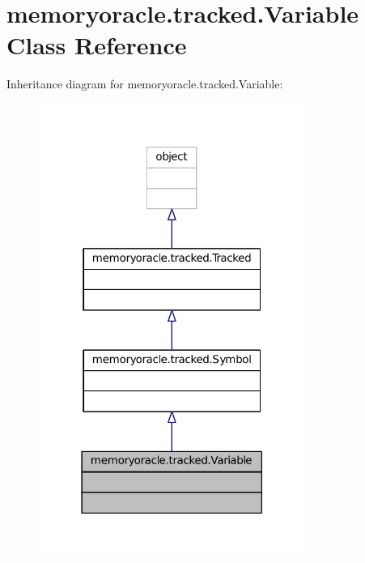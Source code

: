 \hypertarget{classmemoryoracle_1_1tracked_1_1Variable}{}\section{memoryoracle.\+tracked.\+Variable Class Reference}
\label{classmemoryoracle_1_1tracked_1_1Variable}


Inheritance diagram for memoryoracle.\+tracked.\+Variable\+:
\nopagebreak
\begin{figure}[H]
\begin{center}
\leavevmode
\includegraphics[width=247pt]{classmemoryoracle_1_1tracked_1_1Variable__inherit__graph}
\end{center}
\end{figure}


